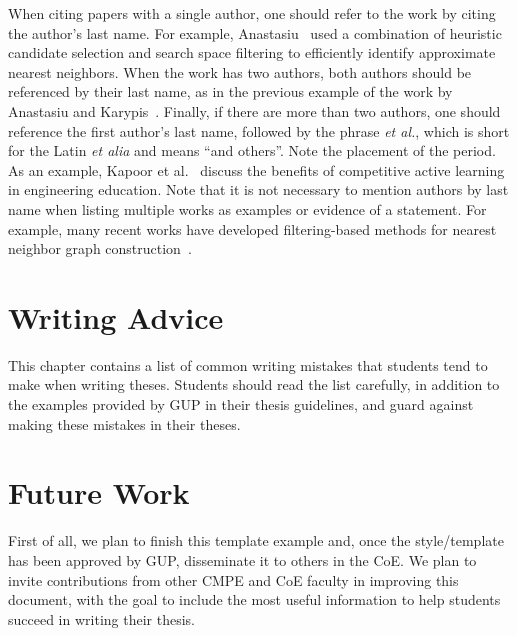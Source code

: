When citing papers with a single author, one should refer to the work by citing the author's last name. For example, Anastasiu~\cite{anastasiu-idsc2017} used a combination of heuristic candidate selection and search space filtering to efficiently identify approximate nearest neighbors. When the work has two authors, both authors should be referenced by their last name, as in the previous example of the work by Anastasiu and Karypis~\cite{anastasiu-dsaa2016}. Finally, if there are more than two authors, one should reference the first author's last name, followed by the phrase \textit{et al.}, which is short for the Latin \textit{et alia} and means ``and others''. Note the placement of the period. As an example, Kapoor et al.~\cite{kapoor-fie2018} discuss the benefits of competitive active learning in engineering education. Note that it is not necessary to mention authors by last name when listing multiple works as examples or evidence of a statement. For example, many recent works have developed filtering-based methods for nearest neighbor graph construction~\cite{anastasiu-icde2014, anastasiu2015, anastasiu-sc2015, anastasiu-sc2016}.


\section{Writing Advice}\label{sec:writing}

This chapter contains a list of common writing mistakes that students tend to make when writing theses. Students should read the list carefully, in addition to the examples provided by GUP in their thesis guidelines, and guard against making these mistakes in their theses.


\section{Future Work}\label{sec:future_work}

First of all, we plan to finish this template example and, once the style/template has been approved by GUP, disseminate it to others in the CoE. We plan to invite contributions from other CMPE and CoE faculty in improving this document, with the goal to include the most useful information to help students succeed in writing their thesis.


